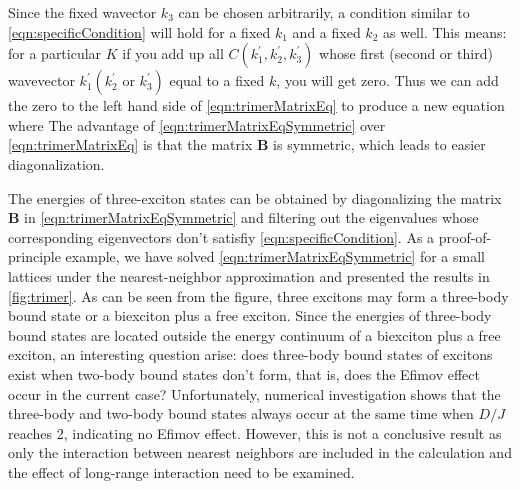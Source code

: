 Since the fixed wavector $k_3$ can be chosen arbitrarily, a condition similar to  \autoref{eqn:specificCondition} will
hold for a fixed $k_1$ and a fixed $k_2$ as well. This means:  for a particular $K$ if you add up all  
$C(k_1^{'}, k_2^{'}, k_3^{'})$ whose first (second or third) wavevector $k_1^{'} ( k_2^{'} \mbox{ or }  k_3^{'})$ equal to a fixed $k$, you will get zero. Thus we can add the zero
 to the left hand side of \autoref{eqn:trimerMatrixEq} to produce a new equation
where
The advantage of \autoref{eqn:trimerMatrixEqSymmetric} over \autoref{eqn:trimerMatrixEq} is that the matrix
$\mathbf{B}$ is symmetric, which leads to easier diagonalization. 

The energies of three-exciton states can be obtained by diagonalizing the matrix $\mathbf{B}$ in
 \autoref{eqn:trimerMatrixEqSymmetric} and filtering out the eigenvalues whose corresponding eigenvectors don't
 satisfiy \autoref{eqn:specificCondition}. As a proof-of-principle example, we have solved
 \autoref{eqn:trimerMatrixEqSymmetric} for a small lattices under the nearest-neighbor approximation and presented
 the results  in \autoref{fig:trimer}. As can be seen from the figure, three excitons may
form a three-body bound state or a biexciton plus a free exciton. Since the energies of three-body bound states are
located outside the energy continuum of a biexciton plus a free exciton, an interesting question arise: does 
three-body bound states of excitons exist when two-body bound states don't form, that is, does the Efimov effect
 occur in the current case? Unfortunately, numerical investigation shows that the three-body and
 two-body bound states always occur at the same time when $D/J$ reaches 2, indicating no Efimov effect. However,
this is not a conclusive result as only the interaction between nearest neighbors are included in the calculation and 
the effect of long-range interaction need to be examined.

